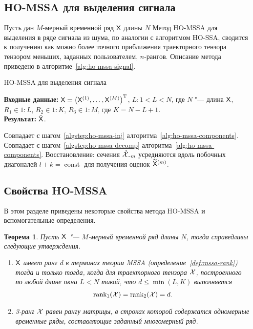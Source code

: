 \documentclass[specialist,
  substylefile=spbu_report.rtx,
subf,href,colorlinks=true, 12pt]{disser}
\theoremstyle{plain}
\newtheorem{theorem}{Теорема}
\theoremstyle{definition}
\theoremstyle{remark}
\newcommand{\Input}{\textbf{Входные данные: }}
\newcommand{\Output}{\textbf{Результат: }}
\begin{document}
\subsection{HO-MSSA для выделения сигнала}
\label{subsec:ho-mssa-desc-signal}
Пусть дан $M$-мерный временной ряд $\mathsf{X}$ длины $N$
Метод HO-MSSA для выделения в ряде сигнала из шума, по аналогии с
алгоритмом HO-SSA, сводится к получению как можно более точного
приближения траекторного тензора тензором меньших,
заданных пользователем, $n$-рангов.
Описание метода приведено в алгоритме~\ref{alg:ho-mssa-signal}.

\begin{algorithm}[!ht]
  \caption{HO-MSSA для выделения сигнала}
  \label{alg:ho-mssa-signal}
  \Input $\mathsf{X} = \left(\mathsf{X}^{(1)}, \ldots, \mathsf{X}^{(M)}\right)^{\mathrm{T}}$,
  $L: 1< L < N$, где $N$ "--- длина $\mathsf{X}$, $R_1 \in \overline{1:L}$,
  $R_2 \in \overline{1:K}$, $R_3 \in \overline{1:M}$, где $K = N-L+1$.\\
  \Output $\tilde{\mathsf{X}}$.
  \begin{algorithmic}[1]
    \State Совпадает с шагом~\ref{algstep:ho-mssa-inj}
    алгоритма~\ref{alg:ho-mssa-components}.
    \State Совпадает с шагом~\ref{algstep:ho-mssa-decomp}
    алгоритма~\ref{alg:ho-mssa-components}.
    \State \label{algstep:ho-mssa-signal-reverse}
    Восстановление:
    сечения $\mathring{\mathcal{X}}_{\cdot\cdot m}$ усредняются вдоль
    побочных диагоналей $l + k = \operatorname{const}$ для
    получения оценок $\widetilde{\mathsf{X}}^{(m)}$.
  \end{algorithmic}
\end{algorithm}

\subsection{Свойства HO-MSSA}
В этом разделе приведены некоторые свойства метода HO-MSSA и
вспомогательные определения.

\begin{theorem}
  \label{state:hosvd-mssa-rang}
  Пусть $\mathsf{X}$ "--- $M$-мерный временной ряд длины $N$, тогда
  справедливы следующие утверждения.
  \begin{enumerate}
    \item $\mathsf{X}$ имеет ранг $d$ в терминах теории \emph{MSSA}
      (определение~\ref{def:mssa-rank})
      тогда и только тогда, когда для траекторного тензора $\mathcal{X}$,
      построенного по любой длине окна
      $L<N$ такой, что $d \leqslant\min(L, K)$ выполняется
      \[\operatorname{rank}_1(\mathcal{X}) = \operatorname{rank}_2(\mathcal{X}) = d.\]
    \item 3-ранг $\mathcal{X}$ равен рангу матрицы,
      в строках которой содержатся одномерные временные ряды,
      составляющие заданный
      многомерный ряд.
  \end{enumerate}
\end{theorem}
\end{document}
